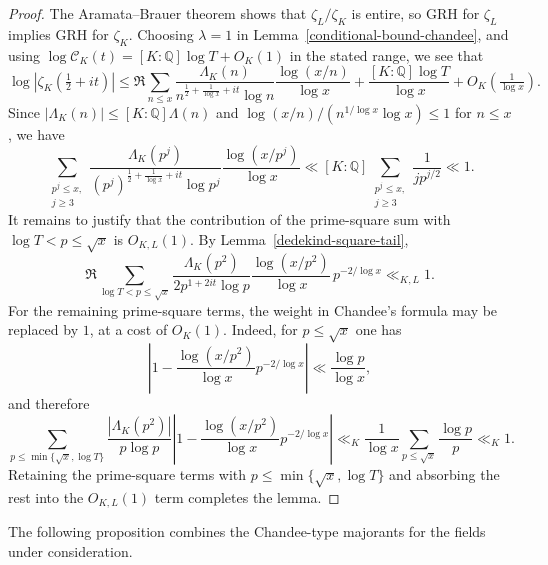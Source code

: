 \documentclass[twoside,reqno,11pt,a4paper]{amsart}
\numberwithin{equation}{section}
\theoremstyle{plain}
\theoremstyle{definition}
\theoremstyle{remark}
\renewcommand{\le}{\leqslant}
\begin{document}
	\begin{proof}
The Aramata--Brauer theorem shows that $\zeta_L/\zeta_K$ is entire, so GRH for $\zeta_L$ implies GRH for $\zeta_K$.  Choosing $\lambda=1$ in Lemma~\ref{conditional-bound-chandee}, and using $\log\mathcal C_K(t)=[K:\mathbb Q]\log T+O_K(1)$ in the stated range, we see that
		\begin{equation*}
			\log \left| \zeta_K\left(\tfrac{1}{2}+it\right)\right|\le  \Re\sum_{n\le  x}\frac{\Lambda_K(n)}{n^{\frac{1}{2}+\frac{1}{\log x}+it}\log n}\frac{\log\left(x/n\right)}{\log x} + \frac{[K:\mathbb{Q}]\log T}{\log x} +O_K\!\left(\tfrac{1}{\log x}\right).
		\end{equation*}
		Since $|\Lambda_K(n)|\le  [K:\mathbb{Q}]\Lambda(n)$ and $\log(x/n)/(n^{1/\log x}\log x)\le  1$ for $n\le  x$, we have
		\begin{equation*}
			\sum_{\substack{{p^j\le  x},\\ 
					j\geqslant 3}} \frac{\Lambda_K(p^j)}{(p^j)^{\frac{1}{2}+\frac{1}{\log x}+it}\log p^j}\frac{\log\left(x/p^j\right)}{\log x} \ll [K:\mathbb{Q}] 	\sum_{\substack{{p^j\le  x}, \\ 
					j\geqslant 3}} \frac{1}{jp^{j/2}} \ll 1.
		\end{equation*}
It remains to justify that the contribution of the prime-square sum with $\log T<p\le \sqrt x$ is $O_{K,L}(1)$.  By Lemma~\ref{dedekind-square-tail},
\begin{equation*}
        \Re\sum_{\log T<p\le  \sqrt x}
        \frac{\Lambda_K(p^2)}{2p^{1+2it}\log p}
        \frac{\log(x/p^2)}{\log x}\,p^{-2/\log x}
        \ll_{K,L}1.
\end{equation*}
For the remaining prime-square terms, the weight in Chandee's formula may be replaced by $1$, at a cost of $O_K(1)$.  Indeed, for $p\le\sqrt x$ one has
\begin{equation*}
        \left|1-\frac{\log(x/p^2)}{\log x}p^{-2/\log x}\right|
        \ll \frac{\log p}{\log x},
\end{equation*}
and therefore
\begin{equation*}
        \sum_{p\le\min\{\sqrt x,\log T\}}
        \frac{|\Lambda_K(p^2)|}{p\log p}
        \left|1-\frac{\log(x/p^2)}{\log x}p^{-2/\log x}\right|
        \ll_K
        \frac1{\log x}\sum_{p\le\sqrt x}\frac{\log p}{p}
        \ll_K1.
\end{equation*}
Retaining the prime-square terms with $p\le\min\{\sqrt x,\log T\}$ and absorbing the rest into the $O_{K,L}(1)$ term completes the lemma.
	\end{proof}
    The following proposition combines the Chandee-type majorants for the fields under consideration.
    
\end{document}
